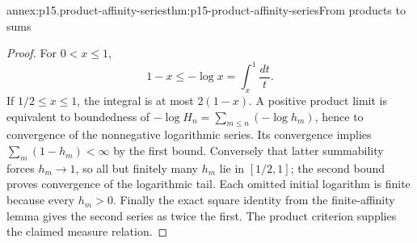 \begin{annexitem}{annex:p15.product-affinity-series}{thm:p15-product-affinity-series}{From products to sums}
\begin{proof}
For \(0<x\leq1\),
\[
             1-x\leq-\log x=\int_x^1\frac{dt}{t}.
\]
If \(1/2\leq x\leq1\), the integral is at most \(2(1-x)\).
A positive product limit is equivalent to boundedness of
\(-\log H_n=\sum_{m\leq n}(-\log h_m)\), hence to convergence of
the nonnegative logarithmic series.
Its convergence implies \(\sum_m(1-h_m)<\infty\) by the first bound.
Conversely that latter summability forces \(h_m\to1\), so all but
finitely many \(h_m\) lie in \([1/2,1]\); the second bound proves
convergence of the logarithmic tail. Each omitted initial logarithm
is finite because every \(h_m>0\). Finally the exact square identity
from the finite-affinity lemma gives the second series as twice
the first. The product criterion supplies the claimed measure relation.
\end{proof}
\end{annexitem}

